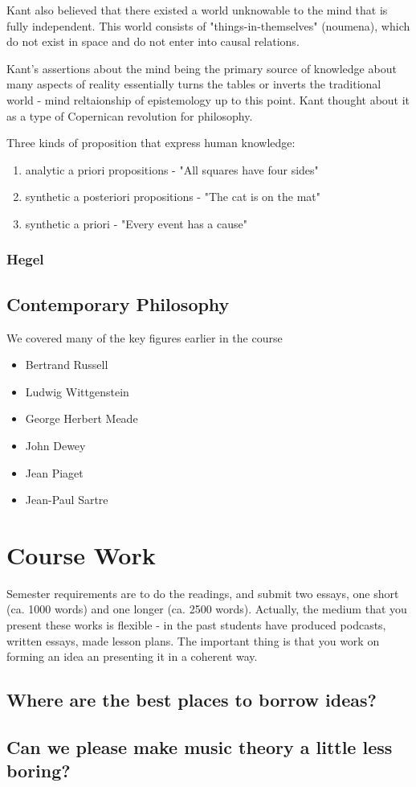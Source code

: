 \documentclass[11pt]{article}
\begin{document}
Kant also believed that there existed a world unknowable to the mind that is 
fully independent. This world consists of "things-in-themselves" (noumena),
which do not exist in space and do not enter into causal relations.

Kant's assertions about the mind being the primary source of knowledge about 
many aspects of reality essentially turns the tables or inverts the traditional
world - mind reltaionship of epistemology up to this point. Kant thought about 
it as a type of Copernican revolution for philosophy.

Three kinds of proposition that express human knowledge:
\begin{enumerate}
\item analytic a priori propositions - "All squares have four sides"
\item synthetic a posteriori propositions - "The cat is on the mat"
\item synthetic a priori - "Every event has a cause"
\end{enumerate}

\subsubsection{Hegel}
\label{sec:orgee70a7d}


\subsection{Contemporary Philosophy}
\label{sec:orgc636368}
We covered many of the key figures earlier in the course

\begin{itemize}
\item Bertrand Russell
\item Ludwig Wittgenstein
\item George Herbert Meade
\item John Dewey
\item Jean Piaget
\item Jean-Paul Sartre
\end{itemize}


\section{Course Work}
\label{sec:org3992a2a}
Semester requirements are to do the readings, and submit two essays,
one short (ca. 1000 words) and one longer (ca. 2500 words). Actually,
the medium that you present these works is flexible - in the past
students have produced podcasts, written essays, made lesson
plans. The important thing is that you work on forming an idea an
presenting it in a coherent way.

\subsection{Where are the best places to borrow ideas?}
\label{sec:org53552e2}
\subsection{Can we please make music theory a little less boring?}
\label{sec:org4024ee7}
\end{document}
